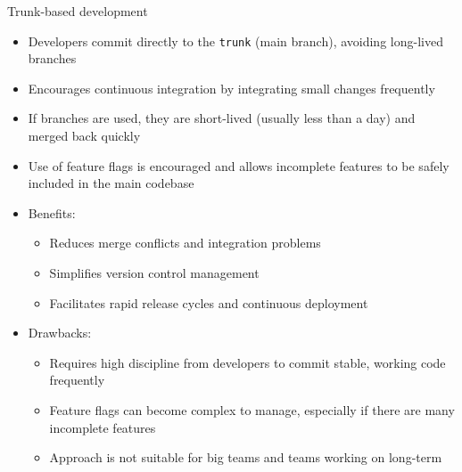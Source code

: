 \documentclass{beamer}
\begin{document}
\begin{frame}{Trunk-based development}
  \begin{itemize}
    \item Developers commit directly to the \texttt{trunk} (main branch), avoiding long-lived branches
    \item Encourages continuous integration by integrating small changes frequently
    \item If branches are used, they are short-lived (usually less than a day) and merged back quickly
    \item Use of feature flags is encouraged and allows incomplete features to be safely included in the main codebase
    \item Benefits:
    \begin{itemize}
      \item Reduces merge conflicts and integration problems
      \item Simplifies version control management
      \item Facilitates rapid release cycles and continuous deployment
    \end{itemize}
    \item Drawbacks:
    \begin{itemize}
      \item Requires high discipline from developers to commit stable, working code frequently
      \item Feature flags can become complex to manage, especially if there are many incomplete features
      \item Approach is not suitable for big teams and teams working on long-term
    \end{itemize}
  \end{itemize}
\end{frame}
\end{document}

